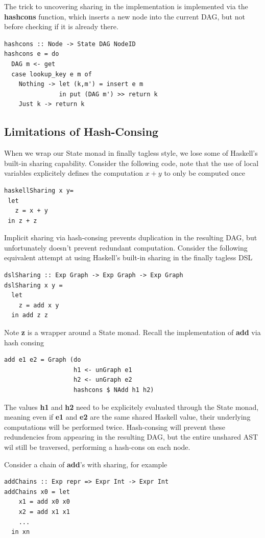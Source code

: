 \documentclass[runningheads]{llncs}
\begin{document}
The trick to uncovering sharing in the implementation is implemented via the
{\bf hashcons} function, which inserts a new node into the current DAG, but not
before checking if it is already there.
\begin{verbatim}
hashcons :: Node -> State DAG NodeID
hashcons e = do
  DAG m <- get
  case lookup_key e m of
    Nothing -> let (k,m') = insert e m
               in put (DAG m') >> return k
    Just k -> return k
\end{verbatim}

\subsection{Limitations of Hash-Consing}

When we wrap our State monad in finally tagless style, we lose some of Haskell's
built-in sharing capability. Consider the following code, note that the use of
local variables explicitely defines the computation $x + y$ to only be computed
once
\begin{verbatim}
haskellSharing x y=
 let
   z = x + y
 in z + z
\end{verbatim}

Implicit sharing via hash-consing prevents duplication in the resulting DAG, but
unfortunately doesn't prevent redundant computation. Consider the following
equivalent attempt at using Haskell's built-in sharing in the finally tagless DSL
\begin{verbatim}
dslSharing :: Exp Graph -> Exp Graph -> Exp Graph
dslSharing x y =
  let
    z = add x y
  in add z z
\end{verbatim}
Note {\bf z} is a wrapper around a State monad. Recall the implementation of
{\bf add} via hash consing
\begin{verbatim}
add e1 e2 = Graph (do
                   h1 <- unGraph e1
                   h2 <- unGraph e2
                   hashcons $ NAdd h1 h2)
\end{verbatim}
The values {\bf h1} and {\bf h2} need to be explicitely evaluated through the
State monad, meaning even if {\bf e1} and {\bf e2} are the same shared Haskell
value, their underlying computations will be performed twice. Hash-consing will
prevent these redundencies from appearing in the resulting DAG, but the entire
unshared AST wil still be traversed, performing a hash-cons on each node.

Consider a chain of {\bf add}'s  with sharing, for example
\begin{verbatim}
addChains :: Exp repr => Expr Int -> Expr Int
addChains x0 = let
    x1 = add x0 x0
    x2 = add x1 x1
    ...
  in xn
\end{verbatim}
\end{document}
